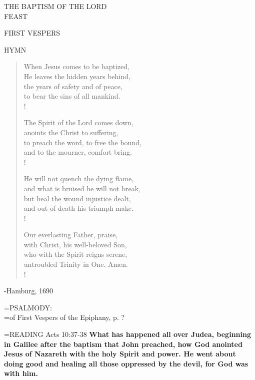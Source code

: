 \begin{center}\normalsize THE BAPTISM OF THE LORD\\
\footnotesize FEAST\\
\end{center}

\begin{flushleft}\normalsize FIRST VESPERS\\\end{flushleft}

\noindent\small{\uppercase{Hymn}}\normalsize
\begin{verse}
When Jesus comes to be baptized,\\
He leaves the hidden years behind,\\
the years of safety and of peace,\\
to bear the sins of all mankind.\\!

The Spirit of the Lord comes down,\\
anoints the Christ to suffering,\\
to preach the word, to free the bound,\\
and to the mourner, comfort bring.\\!

He will not quench the dying flame,\\
and what is bruised he will not break,\\
but heal the wound injustice dealt,\\
and out of death his triumph make.\\!

Our everlasting Father, praise,\\
with Christ, his well-beloved Son,\\
who with the Spirit reigns serene,\\
untroubled Trinity in One. Amen.\\!
\end{verse}

-Hamburg, 1690

\hangindent=\parindent \small{PSALMODY:}\\
\hangindent=\parindent  of First Vespers of the Epiphany, p. ?\vspace{0.5em}

\hangindent=\parindent \small{\uppercase{READING}}   Acts 10:37-38 \textbf{  What has happened all over Judea, beginning in Galilee after the baptism that John preached, how God anointed Jesus of Nazareth with the holy Spirit and power. He went about doing good and healing all those oppressed by the devil, for God was with him.\\}

